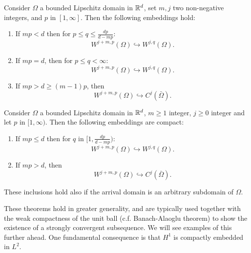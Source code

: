 \begin{theorem}
Consider $\Omega$ a bounded Lipschitz domain in $\mathbb{R}^d$, set $m,j$ two non-negative integers, and $p$ in $[1,\infty]$. Then the following embeddings hold: 
\begin{enumerate}
    \item If $mp < d$ then for $p \leq q \leq \frac{dp}{d-mp}$:
        \begin{equation}
            W^{j+m, p}(\Omega) \hookrightarrow W^{j,q}(\Omega).
        \end{equation}
    \item If $mp = d$, then for $p \leq q < \infty$:
        \begin{equation}
            W^{j+m, p}(\Omega) \hookrightarrow W^{j,q}(\Omega).
        \end{equation}
    \item If $mp > d \geq (m-1)p$, then 
        \begin{equation}
            W^{j+m,p}(\Omega) \hookrightarrow C^j(\bar\Omega).
        \end{equation}
    \end{enumerate}
\end{theorem}

\begin{theorem}
Consider $\Omega$ a bounded Lipschitz domain in $\mathbb{R}^d$, $m\geq 1$ integer, $j\geq 0$ integer and let $p$ in $[1,\infty)$. Then the following embeddings are compact:
\begin{enumerate}
    \item If $mp \leq d$  then for $q$ in $[1, \frac{dp}{d - mp})$:
        \begin{equation}
            W^{j+m, p}(\Omega) \hookrightarrow W^{j,q}(\Omega).
        \end{equation}
    \item If $mp > d$, then 
        \begin{equation}
            W^{j+m, p}(\Omega) \hookrightarrow C^j(\bar\Omega).
        \end{equation}
\end{enumerate}
These inclusions hold also if the arrival domain is an arbitrary subdomain of $\Omega$. 
\end{theorem}
These theorems hold in greater generality, and are typically used together with the weak compactness of the unit ball (c.f. Banach-Alaoglu theorem) to show the existence of a strongly convergent subsequence. We will see examples of this further ahead. One fundamental consequence is that $H^1$ is compactly embedded in $L^2$.

